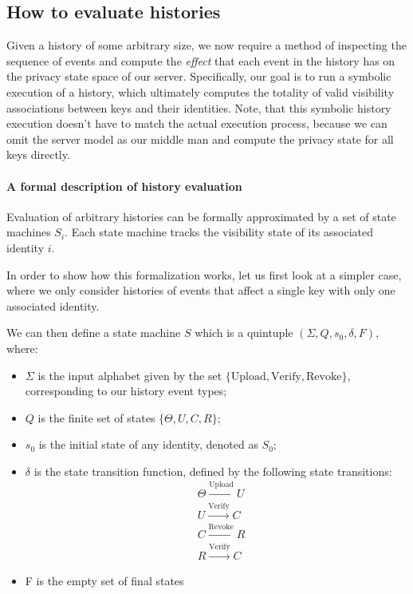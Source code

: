 \subsection{How to evaluate histories}
Given a history of some arbitrary size, we now require a method of inspecting the sequence of events and compute the \emph{effect} that each event in the history has on the privacy state space of our server. 
Specifically, our goal is to run a symbolic execution of a history, which ultimately computes the totality of valid visibility associations between keys and their identities. Note, that this symbolic history execution doesn't have to match the actual execution process, because we can omit the server model as our middle man and compute the privacy state for all keys directly.

\paragraph{A formal description of history evaluation}
\label{sec:history_def}

Evaluation of arbitrary histories can be formally approximated by a set of state machines \(S_i\). Each state machine tracks the visibility state of its associated identity \(i\).

In order to show how this formalization works, let us first look at a simpler case, where we only consider histories of events that affect a single key with only one associated identity. 

We can then define a state machine \(S\) which is a quintuple \((\Sigma,Q,s_0,\delta,F)\), where:
\begin{itemize}
    \item \(\Sigma\) is the input alphabet given by the set \(\{\text{Upload},\text{Verify},\text{Revoke}\}\), corresponding to our history event types;
    \item \(Q\) is the finite set of states \(\{\Theta,U,C,R\}\);
    \item \(s_0\) is the initial state of any identity, denoted as \(S_0\);
    \item \(\delta\) is the state transition function, defined by the following state transitions:
    \begin{equation}
        \begin{aligned}
            &\Theta \xrightarrow{\text{Upload}}U \\
            &U \xrightarrow{\text{Verify}}C \\
            &C \xrightarrow{\text{Revoke}}R \\
            &R \xrightarrow{\text{Verify}}C
        \end{aligned}
    \end{equation}
    \item F is the empty set of final states
\end{itemize}

